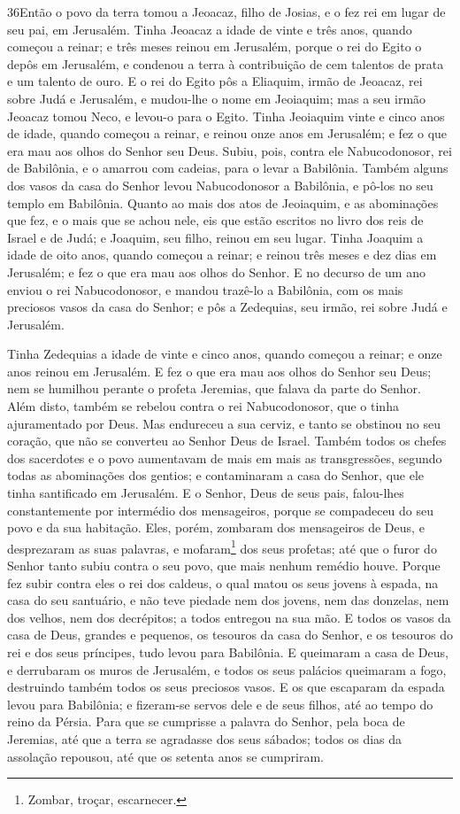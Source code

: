 \lettrine{36} Então o povo da terra tomou a Jeoacaz, filho de
Josias, e o fez rei em lugar de seu pai, em Jerusalém. Tinha
Jeoacaz a idade de vinte e três anos, quando começou a reinar; e
três meses reinou em Jerusalém, porque o rei do Egito o depôs em
Jerusalém, e condenou a terra à contribuição de cem talentos de
prata e um talento de ouro. E o rei do Egito pôs a Eliaquim,
irmão de Jeoacaz, rei sobre Judá e Jerusalém, e mudou-lhe o nome em
Jeoiaquim; mas a seu irmão Jeoacaz tomou Neco, e levou-o para o
Egito. Tinha Jeoiaquim vinte e cinco anos de idade, quando
começou a reinar, e reinou onze anos em Jerusalém; e fez o que era
mau aos olhos do Senhor seu Deus. Subiu, pois, contra ele
Nabucodonosor, rei de Babilônia, e o amarrou com cadeias, para o
levar a Babilônia. Também alguns dos vasos da casa do Senhor
levou Nabucodonosor a Babilônia, e pô-los no seu templo em
Babilônia. Quanto ao mais dos atos de Jeoiaquim, e as
abominações que fez, e o mais que se achou nele, eis que estão
escritos no livro dos reis de Israel e de Judá; e Joaquim, seu
filho, reinou em seu lugar. Tinha Joaquim a idade de oito anos,
quando começou a reinar; e reinou três meses e dez dias em
Jerusalém; e fez o que era mau aos olhos do Senhor. E no
decurso de um ano enviou o rei Nabucodonosor, e mandou trazê-lo a
Babilônia, com os mais preciosos vasos da casa do Senhor; e pôs a
Zedequias, seu irmão, rei sobre Judá e Jerusalém.

Tinha Zedequias a idade de vinte e cinco anos, quando começou a
reinar; e onze anos reinou em Jerusalém. E fez o que era mau
aos olhos do Senhor seu Deus; nem se humilhou perante o profeta
Jeremias, que falava da parte do Senhor. Além disto, também
se rebelou contra o rei Nabucodonosor, que o tinha ajuramentado por
Deus. Mas endureceu a sua cerviz, e tanto se obstinou no seu
coração, que não se converteu ao Senhor Deus de Israel.
Também todos os chefes dos sacerdotes e o povo aumentavam de
mais em mais as transgressões, segundo todas as abominações dos
gentios; e contaminaram a casa do Senhor, que ele tinha santificado
em Jerusalém. E o Senhor, Deus de seus pais, falou-lhes
constantemente por intermédio dos mensageiros, porque se compadeceu
do seu povo e da sua habitação. Eles, porém, zombaram dos
mensageiros de Deus, e desprezaram as suas palavras, e
mofaram\footnote{Zombar, troçar, escarnecer.} dos seus profetas; até
que o furor do Senhor tanto subiu contra o seu povo, que mais nenhum
remédio houve. Porque fez subir contra eles o rei dos
caldeus, o qual matou os seus jovens à espada, na casa do seu
santuário, e não teve piedade nem dos jovens, nem das donzelas, nem
dos velhos, nem dos decrépitos; a todos entregou na sua mão.
E todos os vasos da casa de Deus, grandes e pequenos, os
tesouros da casa do Senhor, e os tesouros do rei e dos seus
príncipes, tudo levou para Babilônia. E queimaram a casa de
Deus, e derrubaram os muros de Jerusalém, e todos os seus palácios
queimaram a fogo, destruindo também todos os seus preciosos vasos.
E os que escaparam da espada levou para Babilônia; e
fizeram-se servos dele e de seus filhos, até ao tempo do reino da
Pérsia. Para que se cumprisse a palavra do Senhor, pela boca
de Jeremias, até que a terra se agradasse dos seus sábados; todos os
dias da assolação repousou, até que os setenta anos se cumpriram.

